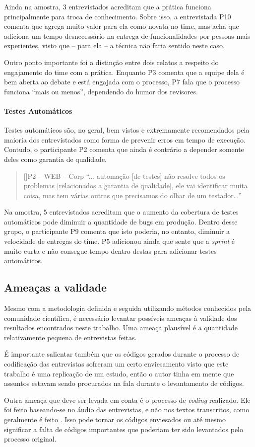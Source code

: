 Ainda na amostra, 3 entrevistados acreditam que a prática funciona principalmente para troca de conhecimento. Sobre isso, a entrevistada P10 comenta que agrega muito valor para ela como novata no time, mas acha que adiciona um tempo desnecessário na entrega de funcionalidades por pessoas mais experientes, visto que -- para ela -- a técnica não faria sentido neste caso.

Outro ponto importante foi a distinção entre dois relatos a respeito do engajamento do time com a prática. Enquanto P3 comenta que a equipe dela é bem aberta ao debate e está engajada com o processo, P7 fala que o processo funciona ``mais ou menos'', dependendo do humor dos revisores.

\paragraph{Testes Automáticos}

Testes automáticos são, no geral, bem vistos e extremamente recomendados pela maioria dos entrevistados como forma de prevenir erros em tempo de execução. Contudo, o participante P2 comenta que ainda é contrário a depender somente deles como garantia de qualidade.

\begin{quotation}[]{P2 -- WEB -- Corp}
    ``... automação [de testes] não resolve todos os problemas [relacionados a garantia de qualidade], ele vai identificar muita coisa, mas tem várias outras que precisamos do olhar de um testador…''
\end{quotation}

Na amostra, 5 entrevistados acreditam que o aumento da cobertura de testes automáticos pode diminuir a quantidade de bugs em produção. Dentro desse grupo, o participante P9 comenta que isto poderia, no entanto, diminuir a velocidade de entregas do time. P5 adicionou ainda que sente que a \emph{sprint} é muito curta e não consegue tempo dentro destas para adicionar testes automáticos.

\subsection{Ameaças a validade}

Mesmo com a metodologia definida e seguida utilizando métodos conhecidos pela comunidade científica, é necessário levantar possíveis ameaças à validade dos resultados encontrados neste trabalho. Uma ameaça plausível é a quantidade relativamente pequena de entrevistas feitas.

É importante salientar também que os códigos gerados durante o processo de codificação das entrevistas sofreram um certo enviesamento visto que este trabalho é uma replicação de um estudo, então o autor tinha em mente que assuntos estavam sendo procurados na fala durante o levantamento de códigos. 

Outra ameaça que deve ser levada em conta é o processo de \emph{coding} realizado. Ele foi feito baseando-se no áudio das entrevistas, e não nos textos transcritos, como geralmente é feito \cite{groundedTheory}. Isso pode tornar os códigos enviesados ou até mesmo significar a falta de códigos importantes que poderiam ter sido levantados pelo processo original.
